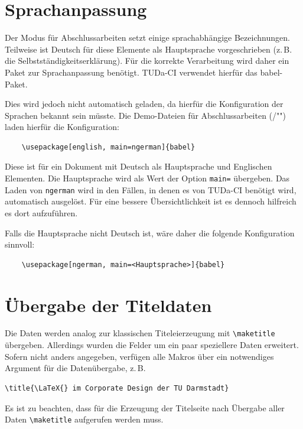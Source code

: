 \section{Sprachanpassung}
Der Modus für Abschlussarbeiten setzt einige sprachabhängige Bezeichnungen.
Teilweise ist Deutsch für diese Elemente als Hauptsprache vorgeschrieben (z.\,B. die Selbstständigkeitserklärung). Für die korrekte Verarbeitung wird daher ein Paket zur Sprachanpassung benötigt.
TUDa-CI verwendet hierfür das babel-Paket.

Dies wird jedoch nicht automatisch geladen, da hierfür die Konfiguration der Sprachen bekannt sein müsste. Die Demo-Dateien für Abschlussarbeiten (/"") laden hierfür die Konfiguration:
\begin{verbatim}
	\usepackage[english, main=ngerman]{babel}
\end{verbatim}
Diese ist für ein Dokument mit Deutsch als Hauptsprache und Englischen Elementen.
Die Hauptsprache wird als Wert der Option \verb+main=+ übergeben.
Das Laden von \verb+ngerman+ wird in den Fällen, in denen es von TUDa-CI benötigt wird, automatisch ausgelöst.
Für eine bessere Übersichtlichkeit ist es dennoch hilfreich es dort aufzuführen.

Falls die Hauptsprache nicht Deutsch ist, wäre daher die folgende Konfiguration sinnvoll:
\begin{verbatim}
	\usepackage[ngerman, main=<Hauptsprache>]{babel}
\end{verbatim}

\section{Übergabe der Titeldaten}

Die Daten werden analog zur klassischen Titeleierzeugung mit \verb+\maketitle+ übergeben. Allerdings wurden die Felder um ein paar speziellere Daten erweitert. Sofern nicht anders angegeben, verfügen alle Makros über ein notwendiges Argument für die Datenübergabe, z.\,B.
\begin{verbatim}
\title{\LaTeX{} im Corporate Design der TU Darmstadt}
\end{verbatim}
Es ist zu beachten, dass für die Erzeugung der Titelseite nach Übergabe aller Daten \verb+\maketitle+ aufgerufen werden muss.

